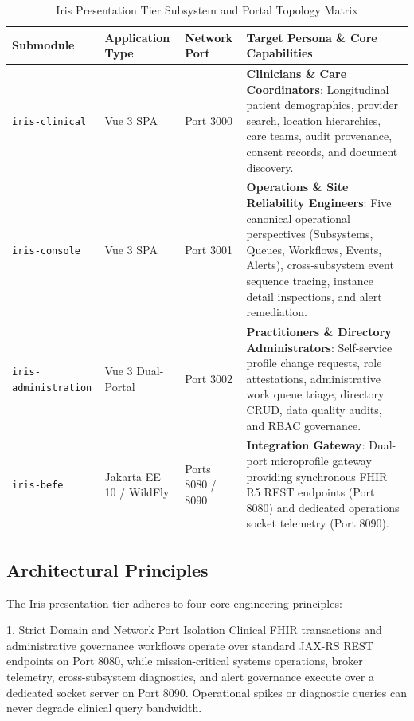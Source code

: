 \begin{table}[htbp]
\centering
\small
\begin{tabularx}{\textwidth}{l p{2.8cm} p{2.2cm} X}
\toprule
\textbf{Submodule} & \textbf{Application Type} & \textbf{Network Port} & \textbf{Target Persona \& Core Capabilities} \\
\midrule
\texttt{iris-clinical} & Vue 3 SPA & Port 3000 & \textbf{Clinicians \& Care Coordinators}: Longitudinal patient demographics, provider search, location hierarchies, care teams, audit provenance, consent records, and document discovery. \\
\addlinespace
\texttt{iris-console} & Vue 3 SPA & Port 3001 & \textbf{Operations \& Site Reliability Engineers}: Five canonical operational perspectives (Subsystems, Queues, Workflows, Events, Alerts), cross-subsystem event sequence tracing, instance detail inspections, and alert remediation. \\
\addlinespace
\texttt{iris-administration} & Vue 3 Dual-Portal & Port 3002 & \textbf{Practitioners \& Directory Administrators}: Self-service profile change requests, role attestations, administrative work queue triage, directory CRUD, data quality audits, and RBAC governance. \\
\addlinespace
\texttt{iris-befe} & Jakarta EE 10 / WildFly & Ports 8080 / 8090 & \textbf{Integration Gateway}: Dual-port microprofile gateway providing synchronous FHIR R5 REST endpoints (Port 8080) and dedicated operations socket telemetry (Port 8090). \\
\bottomrule
\end{tabularx}
\caption{Iris Presentation Tier Subsystem and Portal Topology Matrix}
\label{tab:iris_submodules}
\end{table}

\subsection{Architectural Principles}

The Iris presentation tier adheres to four core engineering principles:

\begin{principlebox}{1. Strict Domain and Network Port Isolation}
Clinical FHIR transactions and administrative governance workflows operate over standard JAX-RS REST endpoints on Port 8080, while mission-critical systems operations, broker telemetry, cross-subsystem diagnostics, and alert governance execute over a dedicated socket server on Port 8090. Operational spikes or diagnostic queries can never degrade clinical query bandwidth.
\end{principlebox}

